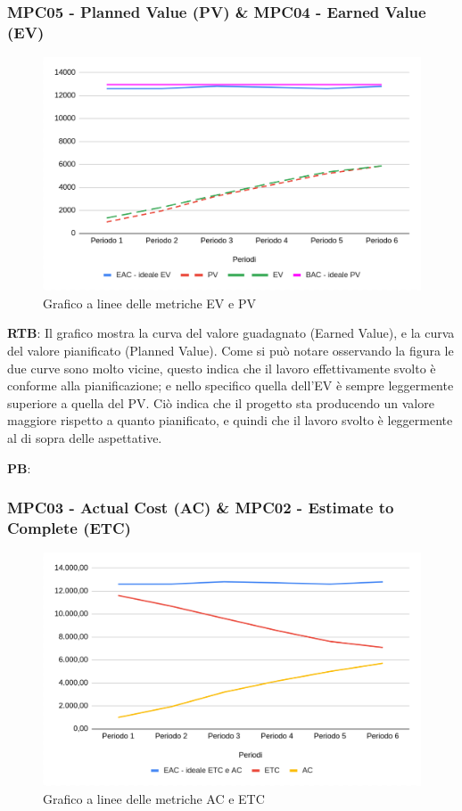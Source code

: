 \documentclass[10pt]{article}
\begin{document}
\begin{justify}
\subsubsection{MPC05 - Planned Value (PV) \& MPC04 - Earned Value (EV)}%

\begin{figure}[H]
  \centering
  \includegraphics[width=0.9\linewidth]{EV-PV.png}
  \caption{Grafico a linee delle metriche EV e PV}
  \label{fig:EV-PVchart}
\end{figure}

\textbf{RTB}: Il grafico mostra la curva del valore guadagnato (Earned Value), e la curva del valore pianificato (Planned Value). Come si può notare osservando la 
figura le due curve sono molto vicine, questo indica che il lavoro effettivamente svolto è conforme alla pianificazione; e nello specifico quella dell'EV è sempre 
leggermente superiore a quella del PV. Ciò indica che il progetto sta producendo un valore maggiore rispetto a quanto pianificato, e quindi che il lavoro svolto 
è leggermente al di sopra delle aspettative.

\noindent
\textbf{PB}:


\subsubsection{MPC03 - Actual Cost (AC) \& MPC02 - Estimate to Complete (ETC)}%

\begin{figure}[H]
  \centering
  \includegraphics[width=0.9\linewidth]{AC-ETC.png}
  \caption{Grafico a linee delle metriche AC e ETC}
  \label{fig:AC-ETCchart}
\end{figure}


\end{justify}
\end{document}
